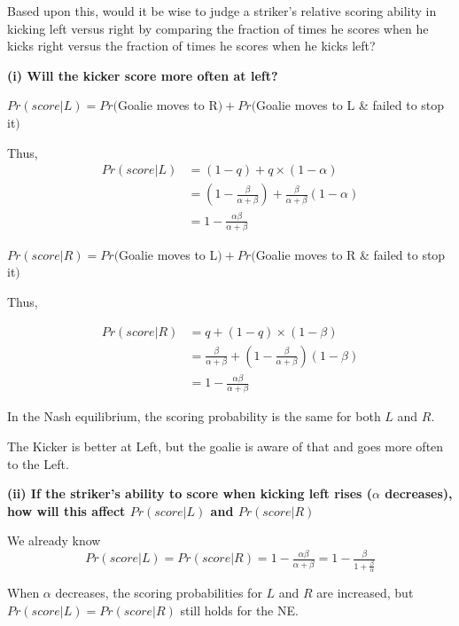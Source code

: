 \documentclass{article}
\begin{document}
 Based upon this, would it be wise to judge a striker's relative scoring ability in kicking left versus right by comparing the fraction of times he scores when he kicks right versus the fraction of times he scores when he kicks left?

\medskip

\textbf{(i) Will the kicker score more often at left?}

\medskip

$Pr(score|L) = Pr($Goalie moves to R$) + Pr($Goalie moves to L \&  failed to stop it$)$

\medskip

Thus, 
\begin{align*}
Pr(score|L) &= (1-q) + q \times (1-\alpha) \\
&= (1-\tfrac{\beta}{\alpha + \beta}) + \tfrac{\beta}{\alpha + \beta} (1-\alpha) \\
&= 1- \tfrac{\alpha \beta }{\alpha + \beta} 
\end{align*}


$Pr(score|R) = Pr($Goalie moves to L$) + Pr($Goalie moves to R \&  failed to stop it$)$

\medskip

Thus, 

\begin{align*}
Pr(score|R) &= q + (1-q)\times (1-\beta)  \\
&= \tfrac{\beta}{\alpha + \beta} + (1-\tfrac{\beta}{\alpha + \beta}) (1-\beta) \\
&=  1- \tfrac{\alpha \beta }{\alpha + \beta}
\end{align*}

In the Nash equilibrium, the scoring probability is the same for both $L$ and $R$.


\begin{mdframed}[backgroundcolor=blue!20,linecolor=white]
The Kicker is better at Left, but the goalie is aware of that and goes more often to the Left.

\end{mdframed}


\textbf{(ii) If the striker's ability to score when kicking left rises ($\alpha$ decreases), how will this affect $Pr(score|L)$ and $Pr(score|R)$}

\medskip

We already know $$Pr(score|L) = Pr(score|R)= 1- \tfrac{\alpha \beta }{\alpha + \beta} =  1- \tfrac{\beta }{1 + \frac{\beta}{\alpha}}$$

When $\alpha$ decreases, the scoring probabilities for $L$ and $R$ are increased, but $Pr(score|L) = Pr(score|R)$ still holds for the NE.
\end{document}
